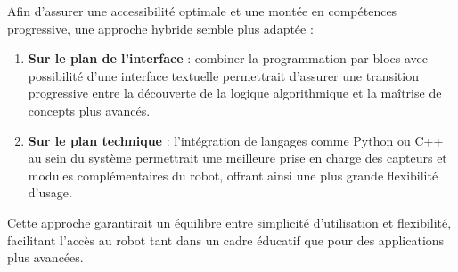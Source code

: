 Afin d’assurer une accessibilité optimale et une montée en compétences progressive, une approche hybride semble plus adaptée : 
\begin{enumerate}
    \item \textbf{Sur le plan de l’interface} : combiner la programmation par blocs avec possibilité d'une interface textuelle permettrait d’assurer une transition progressive entre la découverte de la logique algorithmique et la maîtrise de concepts plus avancés.
    
    \item \textbf{Sur le plan technique} : l’intégration de langages comme Python ou C++ au sein du système permettrait une meilleure prise en charge des capteurs et modules complémentaires du robot, offrant ainsi une plus grande flexibilité d’usage.
\end{enumerate}

Cette approche garantirait un équilibre entre simplicité d’utilisation et flexibilité, facilitant l’accès au robot tant dans un cadre éducatif que pour des applications plus avancées.

